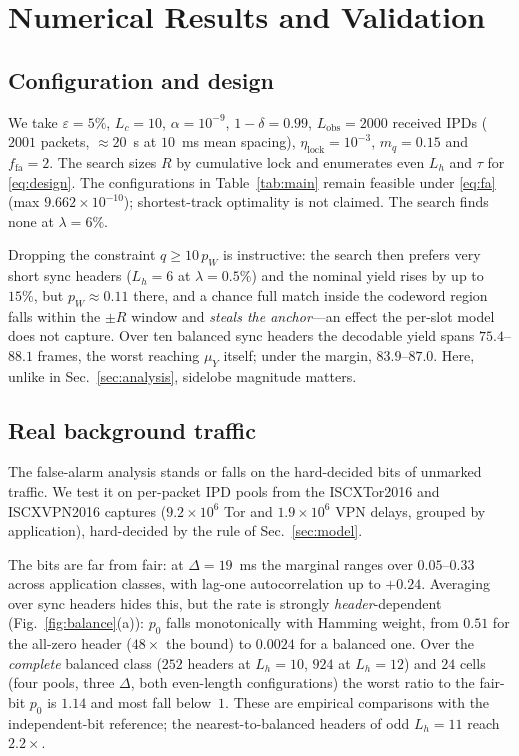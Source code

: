 \documentclass[journal]{IEEEtran}
\newcommand{\Lobs}{L_{\mathrm{obs}}}
\newcommand{\muY}{\mu_Y}
\newcommand{\pbit}{\varepsilon}
\newcommand{\Lh}{L_h}
\begin{document}
\section{Numerical Results and Validation}
\label{sec:num}
\subsection{Configuration and design}
We take $\pbit=5\%$, $L_c=10$, $\alpha=10^{-9}$, $1-\delta=0.99$, $\Lobs=2000$ received IPDs ($2001$ packets, $\approx20$~s at $10$~ms mean spacing), $\eta_{\mathrm{lock}}=10^{-3}$, $m_q=0.15$ and $f_{\mathrm{fa}}=2$. The search sizes $R$ by cumulative lock and enumerates even $\Lh$ and $\tau$ for \eqref{eq:design}. The configurations in Table~\ref{tab:main} remain feasible under \eqref{eq:fa} (max $9.662\times10^{-10}$); shortest-track optimality is not claimed. The search finds none at $\lambda=6\%$.

Dropping the constraint $q\ge10\,p_W$ is instructive: the search then prefers very short sync headers ($\Lh=6$ at $\lambda=0.5\%$) and the nominal yield rises by up to $15\%$, but $p_W\approx0.11$ there, and a chance full match inside the codeword region falls within the $\pm R$ window and \emph{steals the anchor}---an effect the per-slot model does not capture. Over ten balanced sync headers the decodable yield spans $75.4$--$88.1$ frames, the worst reaching $\muY$ itself; under the margin, $83.9$--$87.0$. Here, unlike in Sec.~\ref{sec:analysis}, sidelobe magnitude matters.

\subsection{Real background traffic}
The false-alarm analysis stands or falls on the hard-decided bits of unmarked traffic. We test it on per-packet IPD pools from the ISCXTor2016 and ISCXVPN2016 captures \cite{Lashkari2017Tor,Draper2016VPN} ($9.2\times10^6$ Tor and $1.9\times10^6$ VPN delays, grouped by application), hard-decided by the rule of Sec.~\ref{sec:model}.

The bits are far from fair: at $\Delta=19$~ms the marginal ranges over $0.05$--$0.33$ across application classes, with lag-one autocorrelation up to $+0.24$. Averaging over sync headers hides this, but the rate is strongly \emph{header}-dependent (Fig.~\ref{fig:balance}(a)): $p_0$ falls monotonically with Hamming weight, from $0.51$ for the all-zero header ($48\times$ the bound) to $0.0024$ for a balanced one. Over the \emph{complete} balanced class ($252$ headers at $\Lh=10$, $924$ at $\Lh=12$) and $24$ cells (four pools, three $\Delta$, both even-length configurations) the worst ratio to the fair-bit $p_0$ is $1.14$ and most fall below~$1$. These are empirical comparisons with the independent-bit reference; the nearest-to-balanced headers of odd $\Lh=11$ reach $2.2\times$.
\end{document}
